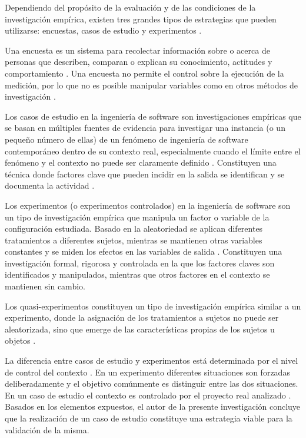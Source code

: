 Dependiendo del propósito de la evaluación y de las condiciones de la investigación empírica, existen tres grandes tipos de estrategias que pueden utilizarse: encuestas, casos de estudio y experimentos \citep{Wohlin2012}.

Una encuesta es un sistema para recolectar información sobre o acerca de personas que describen, comparan o explican su conocimiento, actitudes y comportamiento \citep{Wohlin2012}. Una encuesta no permite el control sobre la ejecución de la medición, por lo que no es posible manipular variables como en otros métodos de investigación \citep{Wohlin2012}.

Los casos de estudio en la ingeniería de software son investigaciones empíricas que se basan en múltiples fuentes de evidencia para investigar una instancia (o un pequeño número de ellas) de un fenómeno de ingeniería de software contemporáneo dentro de su contexto real, especialmente cuando el límite entre el fenómeno y el contexto no puede ser claramente definido \citep{Runeson:2012:CSR:2361717,Wohlin2012}. Constituyen una técnica donde factores clave que pueden incidir en la salida se identifican y se documenta la actividad \citep{stake1995art}. 

Los experimentos (o experimentos controlados) en la ingeniería de software son un tipo de investigación empírica que manipula un factor o variable de la configuración estudiada. Basado en la aleatoriedad se aplican diferentes tratamientos a diferentes sujetos, mientras se mantienen otras variables constantes y se miden los efectos en las variables de salida \citep{Wohlin2012}. Constituyen una investigación formal, rigorosa y controlada en la que los factores claves son identificados y manipulados, mientras que otros factores en el contexto se mantienen sin cambio.

Los quasi-experimentos constituyen un tipo de investigación empírica similar a un experimento, donde la asignación de los tratamientos a sujetos no puede ser aleatorizada, sino que emerge de las características propias de los sujetos u objetos \citep{Wohlin2012}. 

La diferencia entre casos de estudio y experimentos está determinada por el nivel de control del contexto \citep{Petersen:2009:CIS:1671248.1671293}. En un experimento diferentes situaciones son forzadas deliberadamente y el objetivo comúnmente es distinguir entre las dos situaciones. En un caso de estudio el contexto es controlado por el proyecto real analizado \citep{Wohlin2012}. Basados en los elementos expuestos, el autor de la presente investigación concluye que la realización de un caso de estudio constituye una estrategia viable para la validación de la misma. 

